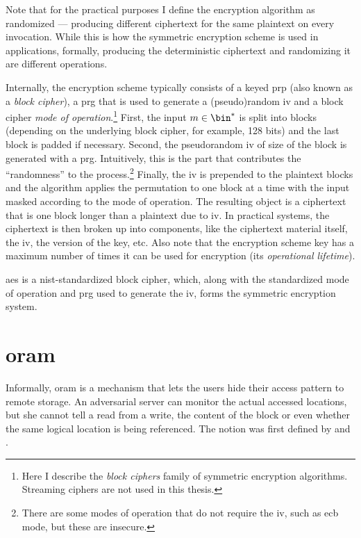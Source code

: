 			Note that for the practical purposes I define the encryption algorithm as randomized --- producing different ciphertext for the same plaintext on every invocation.
			While this is how the symmetric encryption scheme is used in applications, formally, producing the deterministic ciphertext and randomizing it are different operations.

			Internally, the encryption scheme typically consists of a keyed \acrfull{prp} (also known as a \emph{block cipher}), a \acrfull{prg} that is used to generate a (pseudo)random \acrfull{iv} and a block cipher \emph{mode of operation}.\footnote{%
				Here I describe the \emph{block ciphers} family of symmetric encryption algorithms.
				Streaming ciphers are not used in this thesis.
			}
			First, the input $m \in \bin^*$ is split into blocks (depending on the underlying block cipher, for example, 128 bits) and the last block is padded if necessary.
			Second, the pseudorandom \acrlong{iv} of size of the block is generated with a \acrshort{prg}.
			Intuitively, this is the part that contributes the  ``randomness'' to the process.\footnote{
				There are some modes of operation that do not require the \acrlong{iv}, such as \acrfull{ecb} mode, but these are insecure.
			}
			Finally, the \acrshort{iv} is prepended to the plaintext blocks and the algorithm applies the permutation to one block at a time with the input masked according to the mode of operation.
			The resulting object is a ciphertext that is one block longer than a plaintext due to \acrshort{iv}.
			In practical systems, the ciphertext is then broken up into components, like the ciphertext material itself, the \acrshort{iv}, the version of the key, etc.
			Also note that the encryption scheme key has a maximum number of times it can be used for encryption (its \emph{operational lifetime}).

			\acrfull{aes} \cite{aes-nist} is a \acrshort{nist}-standardized block cipher, which, along with the standardized mode of operation \cite{nist-modes} and \acrshort{prg} \cite{nist-prg} used to generate the \acrshort{iv}, forms the symmetric encryption system.

	\section{\texorpdfstring{\acrlong{oram}}{Oblivious Random Access Machine}}\label{section:background:oram}

		Informally, \acrfull{oram} is a mechanism that lets the users hide their access pattern to remote storage.
		An adversarial server can monitor the actual accessed locations, but she cannot tell a read from a write, the content of the block or even whether the same logical location is being referenced.
		The notion was first defined by \textcite{oram-theory} and \textcite{oram-original}.

